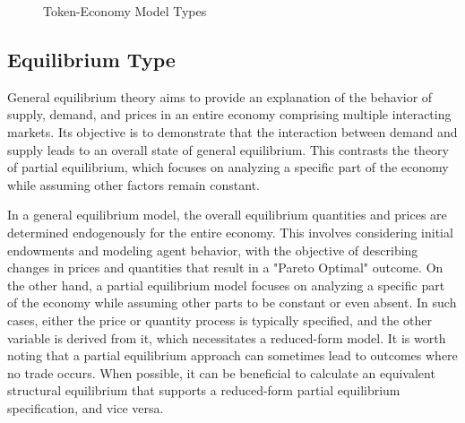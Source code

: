 \documentclass[11pt]{article}
\begin{document}
\begin{figure}[H]
\caption{Token-Economy Model Types} \label{fig:temt}
\end{figure}

\subsection{Equilibrium Type}
General equilibrium theory aims to provide an explanation of the behavior of supply, demand, and prices in an entire economy comprising multiple interacting markets. Its objective is to demonstrate that the interaction between demand and supply leads to an overall state of general equilibrium. This contrasts the theory of partial equilibrium, which focuses on analyzing a specific part of the economy while assuming other factors remain constant.

In a general equilibrium model, the overall equilibrium quantities and prices are determined endogenously for the entire economy. This involves considering initial endowments and modeling agent behavior, with the objective of describing changes in prices and quantities that result in a "Pareto Optimal" outcome. On the other hand, a partial equilibrium model focuses on analyzing a specific part of the economy while assuming other parts to be constant or even absent. In such cases, either the price or quantity process is typically specified, and the other variable is derived from it, which necessitates a reduced-form model. It is worth noting that a partial equilibrium approach can sometimes lead to outcomes where no trade occurs. When possible, it can be beneficial to calculate an equivalent structural equilibrium that supports a reduced-form partial equilibrium specification, and vice versa. 
\end{document}
